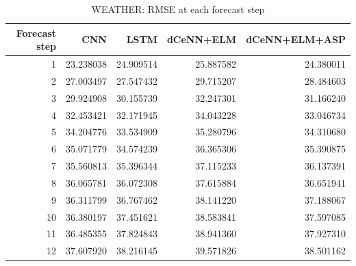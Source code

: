\begin{table}
\caption{WEATHER: RMSE at each forecast step}
\begin{tabular}{rrrrr}
\toprule
Forecast step & CNN & LSTM & dCeNN+ELM & dCeNN+ELM+ASP \\
\midrule
1 & 23.238038 & 24.909514 & 25.887582 & 24.380011 \\
2 & 27.003497 & 27.547432 & 29.715207 & 28.484603 \\
3 & 29.924908 & 30.155739 & 32.247301 & 31.166240 \\
4 & 32.453421 & 32.171945 & 34.043228 & 33.046734 \\
5 & 34.204776 & 33.534909 & 35.280796 & 34.310680 \\
6 & 35.071779 & 34.574239 & 36.365306 & 35.390875 \\
7 & 35.560813 & 35.396344 & 37.115233 & 36.137391 \\
8 & 36.065781 & 36.072308 & 37.615884 & 36.651941 \\
9 & 36.311799 & 36.767462 & 38.141220 & 37.188067 \\
10 & 36.380197 & 37.451621 & 38.583841 & 37.597085 \\
11 & 36.485355 & 37.824843 & 38.941360 & 37.927310 \\
12 & 37.607920 & 38.216145 & 39.571826 & 38.501162 \\
\bottomrule
\end{tabular}
\end{table}
